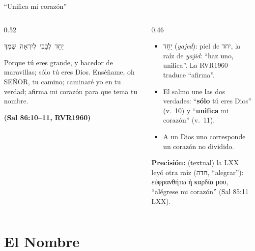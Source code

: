 \documentclass[hyperref={bookmarks=false},aspectratio=169]{beamer}
\newcommand{\heb}[1]{\mbox{\foreignlanguage{hebrew}{#1}}}
\newcommand{\grc}[1]{\foreignlanguage{ancientgreek}{#1}}
\newcommand{\SENOR}{S{\fontsize{0.78em}{1em}\selectfont EÑOR}}
\newcommand{\fuente}[1]{\par\hfill{\upshape\bfseries\footnotesize\textcolor{azul}{#1}}}
\newcommand{\destacar}[1]{\textbf{\textcolor{azul}{#1}}}
\newcommand{\precision}[1]{{\footnotesize\color{gris}\textbf{Precisión:} #1}}
\begin{document}
\begin{frame}{``Unifica mi corazón''}
\begin{columns}[c,onlytextwidth]
\begin{column}{0.52\textwidth}
\begin{center}\heb{יַחֵד לְבָבִי לְיִרְאָה שְׁמֶךָ}\end{center}
\begin{cita}Porque tú eres grande, y hacedor de maravillas; sólo tú eres Dios. Enséñame, oh \SENOR, tu camino; caminaré yo en tu verdad; afirma mi corazón para que tema tu nombre.\fuente{(Sal 86:10--11, RVR1960)}\end{cita}
\end{column}
\begin{column}{0.46\textwidth}\small
\begin{itemize}
\item \heb{יַחֵד} (\emph{yajed}): piel de \heb{יחד}, la raíz de \emph{yajid}: ``haz uno, unifica''. La RVR1960 traduce ``afirma''.
\item El salmo une las dos verdades: ``\destacar{sólo} tú eres Dios'' (v.~10) y ``\destacar{unifica} mi corazón'' (v.~11).
\item A un Dios uno corresponde un corazón no dividido.
\end{itemize}
\precision{(textual) la LXX leyó otra raíz (\heb{חדה}, ``alegrar''): \grc{εὐφρανθήτω ἡ καρδία μου}, ``alégrese mi corazón'' (Sal 85:11 LXX).}
\end{column}
\end{columns}
\end{frame}

\section{El Nombre}
\end{document}
